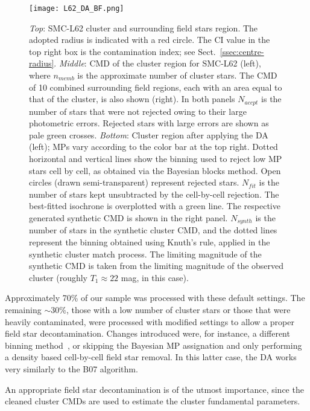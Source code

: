 \documentclass{aa}
\begin{document}
\begin{figure}
\centering
\texttt{[image: L62\_DA\_BF.png]}
\caption{\emph{Top}: SMC-L62 cluster and surrounding field stars
region. The adopted radius is indicated with a red circle. The CI value in the
top right box is the contamination index; see Sect.~\ref{ssec:centre-radius}.
%
\emph{Middle}: CMD of the cluster region for SMC-L62 (left),
where $n_{memb}$ is the approximate number of cluster stars. The CMD
of 10 combined surrounding field regions, each with an area equal to
that of the cluster, is also shown (right).
In both panels $N_{accpt}$ is the number of stars that were not rejected owing to
their large photometric errors. Rejected stars with large errors are shown as
pale green crosses.
%
\emph{Bottom}: Cluster region after applying the DA (left); MPs vary
according to the color bar at the top right. Dotted horizontal and vertical lines
show the binning used to reject low MP stars cell by cell, as obtained via the
Bayesian blocks method. Open circles (drawn semi-transparent) represent rejected
stars.
$N_{fit}$ is the number of stars kept unsubtracted by the cell-by-cell
rejection. The best-fitted isochrone is overplotted with a green line. 
The respective generated synthetic CMD is shown in the right panel. $N_{synth}$
is the number of stars in the synthetic cluster CMD, and the dotted lines
represent the binning obtained using Knuth's rule, applied in the synthetic
cluster match process. The limiting magnitude of the synthetic CMD is
taken from the limiting magnitude of the observed cluster (roughly
$T_1{\approx}22$ mag, in this case).}
\label{fig:DA_BF}
\end{figure}

Approximately 70\% of our sample was processed with these default settings.
The remaining ${\sim}$30\%, those with a low number of cluster stars
or those that were heavily contaminated, were processed with modified settings
to allow a proper field star decontamination.
Changes introduced were, for instance, a different binning
method~\citep[often a rectangular grid using the Scott rule;][]{Scott_1979},
or skipping the Bayesian MP assignation and only performing a density based
cell-by-cell field star removal. In this latter case, the DA works very
similarly to the B07 algorithm.

An appropriate field star decontamination is of the utmost importance, since the
cleaned cluster CMDs are used to estimate the cluster fundamental parameters.


\end{document}
